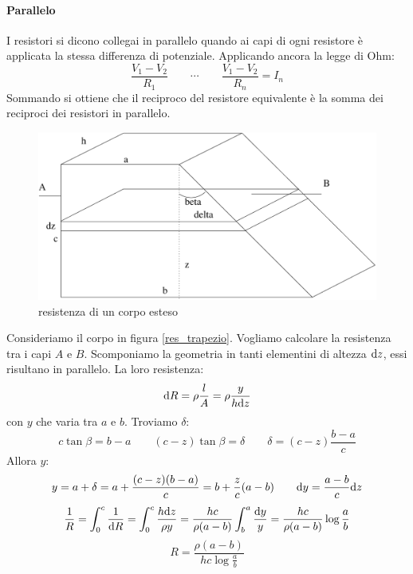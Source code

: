 \paragraph{Parallelo}
I resistori si dicono collegai in parallelo quando ai capi di ogni resistore è applicata la stessa differenza di potenziale. Applicando ancora la legge di Ohm:
\begin{equation*}\frac{V_1-V_2}{R_1}\qquad\cdots\qquad\frac{V_1-V_2}{R_n}=I_n\end{equation*}
Sommando si ottiene che il reciproco del resistore equivalente è la somma dei reciproci dei resistori in parallelo.
\begin{Es}
\begin{figure}[htbp]
\centering
\includegraphics[scale=0.5]{immagini/fisica2/res_trapezio}
\caption{resistenza di un corpo esteso}
\label{res_trapezio}
\end{figure}
Consideriamo il corpo in figura \eqref{res_trapezio}. Vogliamo calcolare la resistenza tra i capi $A$ e $B$. Scomponiamo la geometria in tanti elementini di altezza $\mathrm{d} z$, essi risultano in parallelo. La loro resistenza:
\begin{equation*}\mathrm{d} R=\rho\frac{l}{A}=\rho\frac{y}{h\mathrm{d} z}\end{equation*}
con $y$ che varia tra $a$ e $b$. Troviamo $\delta$:
\begin{equation*}c\tan\beta=b-a\qquad (c-z)\tan\beta=\delta\qquad \delta=(c-z)\frac{b-a}{c}\end{equation*}
Allora $y$:
\begin{equation*}y=a+\delta=a+\frac{(c-z)(b-a)}{c}=b+\frac{z}{c}(a-b)\qquad\mathrm{d} y=\frac{a-b}{c}\mathrm{d} z\end{equation*}
\begin{equation*}\frac{1}{R}=\int_0^c\frac{1}{\mathrm{d} R}=\int_0^c\frac{h\mathrm{d} z}{\rho y}=\frac{hc}{\rho(a-b)}\int_b^a\frac{\mathrm{d} y}{y}=\frac{hc}{\rho(a-b)}\log\frac{a}{b}\end{equation*}
\begin{equation*}R=\frac{\rho(a-b)}{hc\log\frac{a}{b}}\end{equation*}


\end{Es}


